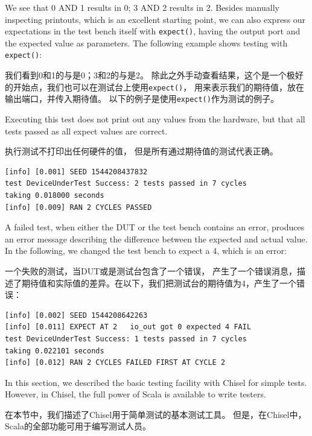 \documentclass[%
    10pt,
    headinclude, footexclude,
    openright, %
    notitlepage,
    cleardoubleempty,
    headsepline,
    pointlessnumbers,
    bibtotoc, idxtotoc,
    ]{scrbook}
\newcommand{\code}[1]{{\small{\texttt{#1}}}}
\newcommand{\todo}[1]{{\emph{TODO: #1}}}
\renewcommand{\todo}[1]{}
\begin{document}
\noindent We see that 0 AND 1 results in 0; 3 AND 2 results in 2.
Besides manually inspecting printouts, which is an excellent starting point, we can also
express our expectations in the test bench itself with \code{expect()},
having the output port and the expected value as parameters.
The following example shows testing with \code{expect()}:

\noindent 我们看到0和1的与是0；3和2的与是2。
除此之外手动查看结果，这个是一个极好的开始点，我们也可以在测试台上使用\code{expect()}，
用来表示我们的期待值，放在输出端口，并传入期待值。
以下的例子是使用\code{expect()}作为测试的例子。


\noindent Executing this test does not print out any values from the hardware,
but that all tests passed as all expect values are correct.

\noindent 执行测试不打印出任何硬件的值，
但是所有通过期待值的测试代表正确。

\begin{verbatim}
[info] [0.001] SEED 1544208437832
test DeviceUnderTest Success: 2 tests passed in 7 cycles
taking 0.018000 seconds
[info] [0.009] RAN 2 CYCLES PASSED
\end{verbatim}

\noindent A failed test, when either the DUT or the test bench contains an error,
produces an error message describing the difference between the expected and actual
value. In the following, we changed the test bench to expect a 4, which is an error:

\noindent 一个失败的测试，当DUT或是测试台包含了一个错误，
产生了一个错误消息，描述了期待值和实际值的差异。在以下，我们把测试台的期待值为4，产生了一个错误：

\begin{verbatim}
[info] [0.002] SEED 1544208642263
[info] [0.011] EXPECT AT 2   io_out got 0 expected 4 FAIL
test DeviceUnderTest Success: 1 tests passed in 7 cycles
taking 0.022101 seconds
[info] [0.012] RAN 2 CYCLES FAILED FIRST AT CYCLE 2
\end{verbatim}

In this section, we described the basic testing facility with Chisel for simple tests.
However, in Chisel, the full power of Scala is available to write testers.
\todo{Have a link to the not yet written section for: We will show these possibilities later.}

在本节中，我们描述了Chisel用于简单测试的基本测试工具。
但是，在Chisel中，Scala的全部功能可用于编写测试人员。
\end{document}
